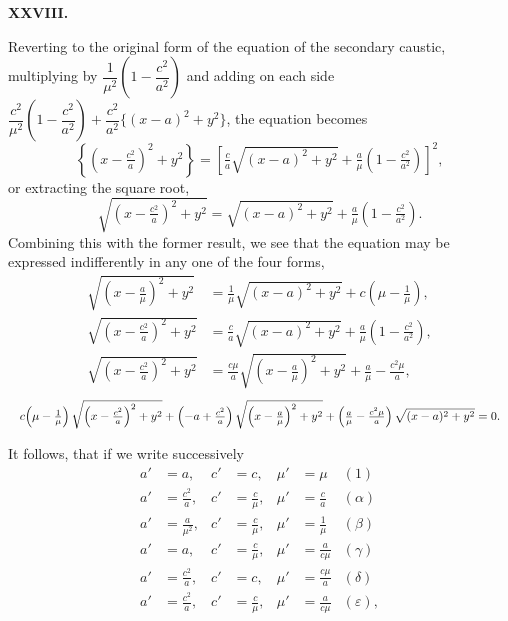 \documentclass[11pt]{article}
\begin{document}
\bigskip
\begin{center}\textbf{XXVIII.}\end{center}
Reverting to the original form of the equation of the secondary caustic, multiplying by $\dfrac{1}{\mu^2}\!\left(1 - \dfrac{c^2}{a^2}\right)$ and adding on each side $\dfrac{c^2}{\mu^2}\!\left(1 - \dfrac{c^2}{a^2}\right) + \dfrac{c^2}{a^2}\{(x - a)^2 + y^2\}$, the equation becomes
\[
\left\{\left(x - \tfrac{c^2}{a}\right)^2 + y^2\right\} = \left[\tfrac{c}{a}\sqrt{(x-a)^2 + y^2} + \tfrac{a}{\mu}\!\left(1 - \tfrac{c^2}{a^2}\right)\right]^2,
\]
or extracting the square root,
\[
\sqrt{\left(x - \tfrac{c^2}{a}\right)^2 + y^2} = \sqrt{(x-a)^2 + y^2} + \tfrac{a}{\mu}\!\left(1 - \tfrac{c^2}{a^2}\right).
\]
Combining this with the former result, we see that the equation may be expressed indifferently in any one of the four forms,
\begin{align*}
\sqrt{\left(x - \tfrac{a}{\mu}\right)^2 + y^2} &= \tfrac{1}{\mu}\sqrt{(x - a)^2 + y^2} + c\!\left(\mu - \tfrac{1}{\mu}\right), \\
\sqrt{\left(x - \tfrac{c^2}{a}\right)^2 + y^2} &= \tfrac{c}{a}\sqrt{(x - a)^2 + y^2} + \tfrac{a}{\mu}\!\left(1 - \tfrac{c^2}{a^2}\right), \\
\sqrt{\left(x - \tfrac{c^2}{a}\right)^2 + y^2} &= \tfrac{c\mu}{a}\sqrt{\left(x - \tfrac{a}{\mu}\right)^2 + y^2} + \tfrac{a}{\mu} - \tfrac{c^2 \mu}{a},
\end{align*}
\[
\resizebox{\textwidth}{!}{$\displaystyle
c\!\left(\mu - \tfrac{1}{\mu}\right)\sqrt{\left(x - \tfrac{c^2}{a}\right)^2 + y^2} + \left(-a + \tfrac{c^2}{a}\right)\sqrt{\left(x - \tfrac{a}{\mu}\right)^2 + y^2} + \left(\tfrac{a}{\mu} - \tfrac{c^2 \mu}{a}\right)\sqrt{(x - a)^2 + y^2} = 0.$}
\]

It follows, that if we write successively
\begin{align*}
a' &= a, & c' &= c, & \mu' &= \mu & (1) \\
a' &= \tfrac{c^2}{a}, & c' &= \tfrac{c}{\mu}, & \mu' &= \tfrac{c}{a} & (\alpha) \\
a' &= \tfrac{a}{\mu^2}, & c' &= \tfrac{c}{\mu}, & \mu' &= \tfrac{1}{\mu} & (\beta) \\
a' &= a, & c' &= \tfrac{c}{\mu}, & \mu' &= \tfrac{a}{c\mu} & (\gamma) \\
a' &= \tfrac{c^2}{a}, & c' &= c, & \mu' &= \tfrac{c\mu}{a} & (\delta) \\
a' &= \tfrac{c^2}{a}, & c' &= \tfrac{c}{\mu}, & \mu' &= \tfrac{a}{c\mu} & (\varepsilon),
\end{align*}
\end{document}
